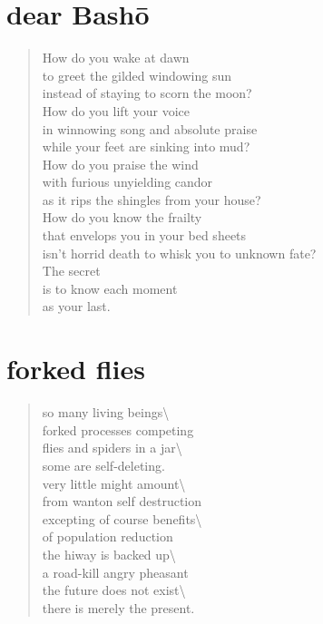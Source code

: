 \documentclass[times,12pt]{book}
\begin{document}
\section*{dear Bash\=o}
\begin{verse}
How do you wake at dawn\\
to greet the gilded windowing sun\\
instead of staying to scorn the moon?\\[10pt]

How do you lift your voice\\
in winnowing song and absolute praise\\
while your feet are sinking into mud?\\[10pt]

How do you praise the wind\\
with furious unyielding candor\\
as it rips the shingles from your house?\\[10pt]

How do you know the frailty\\
that envelops you in your bed sheets\\
isn't horrid death to whisk you to unknown fate?\\[10pt]

The secret\\
is to know each moment\\
as your last.
\end{verse}
\newpage

\section*{forked flies}
\begin{verse}
so many living beings\textbackslash\\
forked processes competing\\
flies and spiders in a jar\textbackslash\\
some are self-deleting.\\[10pt]

very little might amount\textbackslash\\
from wanton self destruction\\
excepting of course benefits\textbackslash\\
of population reduction\\[10pt]

the hiway is backed up\textbackslash\\
a road-kill angry pheasant\\
the future does not exist\textbackslash\\
there is merely the present.\\
\end{verse}
\end{document}
